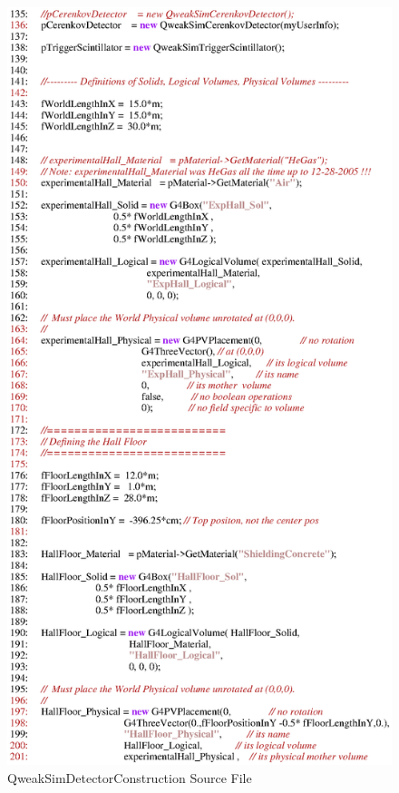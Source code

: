\begin{figure}[ht]
  \hspace{0cm}
  \includegraphics[scale=0.8]{./figures4/QweakSimDetectorConstruction.cc-p3.eps}
  \caption{QweakSimDetectorConstruction Source File}
           \label{fig:V-SC-7}
\end{figure}
\clearpage

